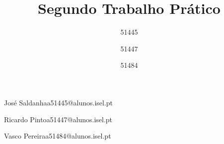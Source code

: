 \def\thetitle{%
 Segundo Trabalho Prático
}
\def\theauthor{%
 JRV
}

\title{ \thetitle }

\author{51445}{José Saldanha}{a51445@alunos.isel.pt}
\author{51447}{Ricardo Pinto}{a51447@alunos.isel.pt}
\author{51484}{Vasco Pereira}{a51484@alunos.isel.pt}



